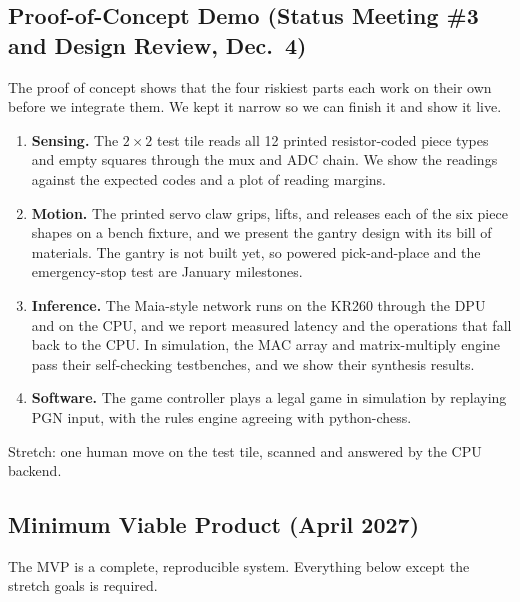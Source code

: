 \documentclass[10pt]{article}
\newcommand{\lead}[1]{\textbf{#1}}
\begin{document}
\subsection{Proof-of-Concept Demo (Status Meeting \#3 and Design Review, Dec.\ 4)}

The proof of concept shows that the four riskiest parts each work on their own before we integrate
them. We kept it narrow so we can finish it and show it live.

\begin{enumerate}[label=\textbf{PoC-\arabic*.}, leftmargin=3.6em]
\item \lead{Sensing.} The $2\times2$ test tile reads all 12 printed resistor-coded piece types and
  empty squares through the mux and ADC chain. We show the readings against the expected codes and
  a plot of reading margins.
\item \lead{Motion.} The printed servo claw grips, lifts, and releases each of the six piece shapes
  on a bench fixture, and we present the gantry design with its bill of materials. The gantry is
  not built yet, so powered pick-and-place and the emergency-stop test are January milestones.
\item \lead{Inference.} The Maia-style network runs on the KR260 through the DPU and on the CPU,
  and we report measured latency and the operations that fall back to the CPU. In simulation, the
  MAC array and matrix-multiply engine pass their self-checking testbenches, and we show their
  synthesis results.
\item \lead{Software.} The game controller plays a legal game in simulation by replaying PGN input,
  with the rules engine agreeing with python-chess.
\end{enumerate}

Stretch: one human move on the test tile, scanned and answered by the CPU backend.

\subsection{Minimum Viable Product (April 2027)}

The MVP is a complete, reproducible system. Everything below except the stretch goals is required.
\end{document}

